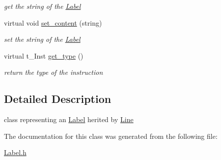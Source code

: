 \begin{DoxyCompactItemize}
\begin{DoxyCompactList}\small\item\em get the string of the \hyperlink{classLabel}{\-Label} \end{DoxyCompactList}\item 
\hypertarget{classLabel_a16f1db5a51a093f3963a2d902bce845f}{virtual void \hyperlink{classLabel_a16f1db5a51a093f3963a2d902bce845f}{set\-\_\-content} (string)}\label{classLabel_a16f1db5a51a093f3963a2d902bce845f}

\begin{DoxyCompactList}\small\item\em set the string of the \hyperlink{classLabel}{\-Label} \end{DoxyCompactList}\item 
\hypertarget{classLabel_af123355b73ac457171c3118052d145ac}{virtual t\-\_\-\-Inst \hyperlink{classLabel_af123355b73ac457171c3118052d145ac}{get\-\_\-type} ()}\label{classLabel_af123355b73ac457171c3118052d145ac}

\begin{DoxyCompactList}\small\item\em return the type of the instruction \end{DoxyCompactList}\end{DoxyCompactItemize}


\subsection{\-Detailed \-Description}
class representing an \hyperlink{classLabel}{\-Label} herited by \hyperlink{classLine}{\-Line} 

\-The documentation for this class was generated from the following file\-:\begin{DoxyCompactItemize}
\item 
\hyperlink{Label_8h}{\-Label.\-h}\end{DoxyCompactItemize}
